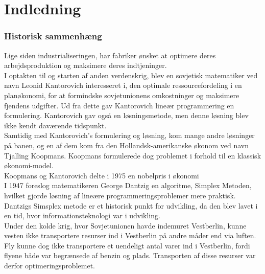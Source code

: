 \chapter{Indledning}
\subsection{Historisk sammenhæng}
Lige siden industrialiseringen, har fabriker ønsket at optimere deres arbejdsproduktion og maksimere deres indtjeninger. \\ %
I optakten til og starten af anden verdenskrig, blev en sovjetisk matematiker ved navn Leonid Kantorovich interesseret i, den optimale ressourcefordeling i en planøkonomi, for at formindske sovjetunionens omkostninger og maksimere fjendens udgifter. Ud fra dette gav Kantorovich lineær programmering en formulering. Kantorovich gav også en løsningsmetode, men denne løsning blev ikke kendt daværende tidspunkt.\\
Samtidig med Kantorovich's formulering og løsning, kom  mange andre løsninger på banen, og en af dem kom fra den Hollandsk-amerikanske økonom ved navn Tjalling Koopmans. Koopmans formulerede dog problemet i forhold til en klassisk økonomi-model.\\
Koopmans og Kantorovich delte i 1975 en nobelpris i økonomi\\
I 1947 foreslog matematikeren George Dantzig en algoritme, Simplex Metoden, hvilket gjorde løsning af lineære programmeringsproblemer mere praktisk.\\
Dantzigs Simsplex metode er et historisk punkt for udvikling, da den blev lavet i en tid, hvor informationsteknologi var i udvikling.
\\%
Under den kolde krig, hvor Sovjetunionen havde indemuret Vestberlin, kunne vesten ikke transportere resurser ind i Vestberlin på andre måder end via luften.
Fly kunne dog ikke transportere et uendeligt antal varer ind i Vestberlin, fordi flyene både var begrænsede af benzin og plads. 
Transporten af disse resurser var derfor optimeringsproblemet.



